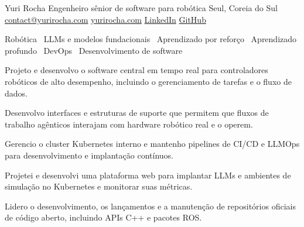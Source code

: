 \documentclass[10pt,a4paper]{article}
\begin{document}
\cvheader
  {Yuri Rocha}
  {Engenheiro sênior de software para robótica}
  {Seul, Coreia do Sul}
  {\href{mailto:contact@yurirocha.com}{contact@yurirocha.com}\enspace\textbullet\enspace
   \href{https://www.yurirocha.com}{yurirocha.com}\enspace\textbullet\enspace
   \href{https://www.linkedin.com/in/yurirocha15/}{LinkedIn}\enspace\textbullet\enspace
   \href{https://github.com/yurirocha15}{GitHub}}

{\small Robótica \textbullet\ LLMs e modelos fundacionais \textbullet\ Aprendizado por reforço \textbullet\ Aprendizado profundo \textbullet\ DevOps \textbullet\ Desenvolvimento de software\par}


\begin{cvbullets}
  \item Projeto e desenvolvo o software central em tempo real para controladores robóticos de alto desempenho, incluindo o gerenciamento de tarefas e o fluxo de dados.
  \item Desenvolvo interfaces e estruturas de suporte que permitem que fluxos de trabalho agênticos interajam com hardware robótico real e o operem.
  \item Gerencio o cluster Kubernetes interno e mantenho pipelines de CI/CD e LLMOps para desenvolvimento e implantação contínuos.
  \item Projetei e desenvolvi uma plataforma web para implantar LLMs e ambientes de simulação no Kubernetes e monitorar suas métricas.
  \item Lidero o desenvolvimento, os lançamentos e a manutenção de repositórios oficiais de código aberto, incluindo APIs C++ e pacotes ROS.
\end{cvbullets}
\end{document}
